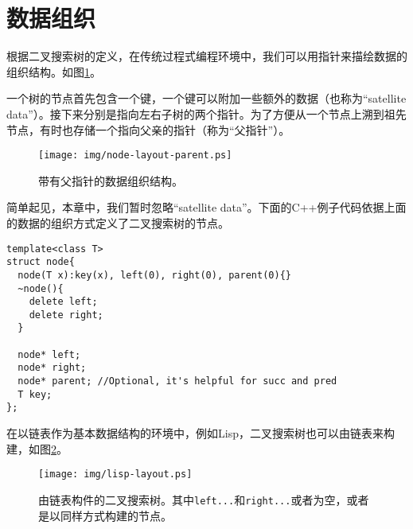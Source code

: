 \documentclass[UTF8]{article}
\begin{document}
\section{数据组织}

根据二叉搜索树的定义，在传统过程式编程环境中，我们可以用指针来描绘数据的组织结构。如图\ref{fig:node-layout-parent}。


一个树的节点首先包含一个键，一个键可以附加一些额外的数据（也称为“satellite data”）。接下来分别是指向左右子树的两个指针。为了方便从一个节点上溯到祖先节点，有时也存储一个指向父亲的指针（称为“父指针”）。

\begin{figure}[htbp]
  \centering
  \texttt{[image: img/node-layout-parent.ps]}
  \caption{带有父指针的数据组织结构。} \label{fig:node-layout-parent}
\end{figure}

简单起见，本章中，我们暂时忽略“satellite data”。下面的C++例子代码依据上面的数据的组织方式定义了二叉搜索树的节点。

\lstset{language=C++}
\begin{lstlisting}
template<class T>
struct node{
  node(T x):key(x), left(0), right(0), parent(0){}
  ~node(){
    delete left;
    delete right;
  }

  node* left;
  node* right;
  node* parent; //Optional, it's helpful for succ and pred
  T key;
};
\end{lstlisting}

在以链表作为基本数据结构的环境中，例如Lisp，二叉搜索树也可以由链表来构建，如图\ref{fig:lisp-layout}。

\begin{figure}[htbp]
  \centering
  \texttt{[image: img/lisp-layout.ps]}
  \caption{由链表构件的二叉搜索树。其中\texttt{left...}和\texttt{right...}或者为空，或者是以同样方式构建的节点。}
  \label{fig:lisp-layout}
\end{figure}
\end{document}
